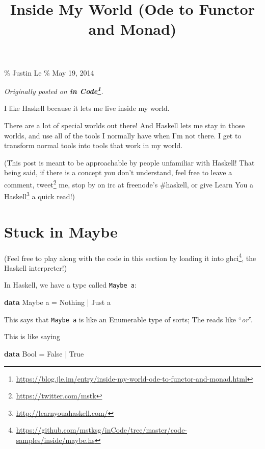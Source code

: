 \documentclass[]{article}
\title{Inside My World (Ode to Functor and Monad)}
\newenvironment{Shaded}{}{}
\newcommand{\DataTypeTok}[1]{\textcolor[rgb]{0.56,0.13,0.00}{#1}}
\newcommand{\KeywordTok}[1]{\textcolor[rgb]{0.00,0.44,0.13}{\textbf{#1}}}
\newcommand{\NormalTok}[1]{#1}
\newcommand{\OperatorTok}[1]{\textcolor[rgb]{0.40,0.40,0.40}{#1}}
\newcommand{\OtherTok}[1]{\textcolor[rgb]{0.00,0.44,0.13}{#1}}
\renewcommand{\href}[2]{#2\footnote{\url{#1}}}
\begin{document}
\maketitle

\% Justin Le \% May 19, 2014

\emph{Originally posted on
\textbf{\href{https://blog.jle.im/entry/inside-my-world-ode-to-functor-and-monad.html}{in
Code}}.}

I like Haskell because it lets me live inside my world.

There are a lot of special worlds out there! And Haskell lets me stay in those
worlds, and use all of the tools I normally have when I'm not there. I get to
transform normal tools into tools that work in my world.

(This post is meant to be approachable by people unfamiliar with Haskell! That
being said, if there is a concept you don't understand, feel free to leave a
comment, \href{https://twitter.com/mstk}{tweet} me, stop by on irc at freenode's
\#haskell, or give \href{http://learnyouahaskell.com/}{Learn You a Haskell} a
quick read!)

\section{Stuck in Maybe}\label{stuck-in-maybe}

(Feel free to play along with the code in this section by
\href{https://github.com/mstksg/inCode/tree/master/code-samples/inside/maybe.hs}{loading
it into ghci}, the Haskell interpreter!)

In Haskell, we have a type called \texttt{Maybe\ a}:

\begin{Shaded}
\begin{Highlighting}[]
\KeywordTok{data} \DataTypeTok{Maybe}\NormalTok{ a }\OtherTok{=} \DataTypeTok{Nothing} \OperatorTok{|} \DataTypeTok{Just}\NormalTok{ a}
\end{Highlighting}
\end{Shaded}

This says that \texttt{Maybe\ a} is like an Enumerable type of sorts; The
\texttt{\textbar{}} reads like ``\emph{or}''.

This is like saying

\begin{Shaded}
\begin{Highlighting}[]
\KeywordTok{data} \DataTypeTok{Bool} \OtherTok{=} \DataTypeTok{False} \OperatorTok{|} \DataTypeTok{True}
\end{Highlighting}
\end{Shaded}
\end{document}
